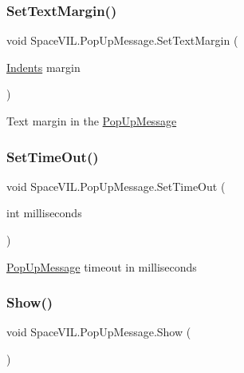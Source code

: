 \subsubsection{\texorpdfstring{Set\+Text\+Margin()}{SetTextMargin()}}
{\footnotesize\ttfamily void Space\+V\+I\+L.\+Pop\+Up\+Message.\+Set\+Text\+Margin (\begin{DoxyParamCaption}\item[{\mbox{\hyperlink{struct_space_v_i_l_1_1_decorations_1_1_indents}{Indents}}}]{margin }\end{DoxyParamCaption})\hspace{0.3cm}{\ttfamily [inline]}}



Text margin in the \mbox{\hyperlink{class_space_v_i_l_1_1_pop_up_message}{Pop\+Up\+Message}} 

\mbox{\label{class_space_v_i_l_1_1_pop_up_message_aed1edbb9ca961585032b46bebd61fbea}} 
\subsubsection{\texorpdfstring{Set\+Time\+Out()}{SetTimeOut()}}
{\footnotesize\ttfamily void Space\+V\+I\+L.\+Pop\+Up\+Message.\+Set\+Time\+Out (\begin{DoxyParamCaption}\item[{int}]{milliseconds }\end{DoxyParamCaption})\hspace{0.3cm}{\ttfamily [inline]}}



\mbox{\hyperlink{class_space_v_i_l_1_1_pop_up_message}{Pop\+Up\+Message}} timeout in milliseconds 

\mbox{\label{class_space_v_i_l_1_1_pop_up_message_acd66fca578bf2547f983d48650b0f618}} 
\subsubsection{\texorpdfstring{Show()}{Show()}}
{\footnotesize\ttfamily void Space\+V\+I\+L.\+Pop\+Up\+Message.\+Show (\begin{DoxyParamCaption}{ }\end{DoxyParamCaption})\hspace{0.3cm}{\ttfamily [inline]}}




